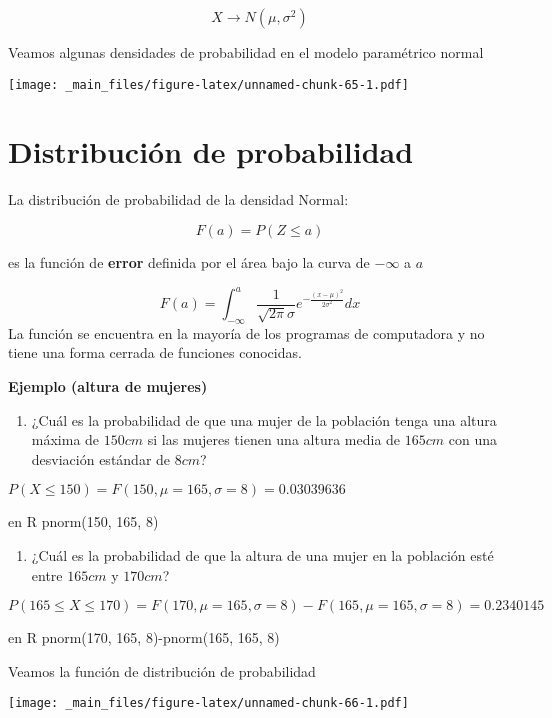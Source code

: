 \documentclass[
]{book}
\providecommand{\tightlist}{%
  \setlength{\itemsep}{0pt}\setlength{\parskip}{0pt}}
\begin{document}
\[X\rightarrow N(\mu,\sigma^2)\]

Veamos algunas densidades de probabilidad en el modelo paramétrico normal

\texttt{[image: \_main\_files/figure-latex/unnamed-chunk-65-1.pdf]}

\hypertarget{distribuciuxf3n-de-probabilidad-2}{%
\section{Distribución de probabilidad}\label{distribuciuxf3n-de-probabilidad-2}}

La distribución de probabilidad de la densidad Normal:

\[F(a)=P(Z \leq a)\]

es la función de \textbf{error} definida por el área bajo la curva de \(-\infty\) a \(a\)

\[F(a)=\int_{-\infty}^{a}\frac{1}{\sqrt{2\pi}\sigma}e^{-\frac{(x-\mu) ^2}{2\sigma^2}} dx\]
La función se encuentra en la mayoría de los programas de computadora y no tiene una forma cerrada de funciones conocidas.

\textbf{Ejemplo (altura de mujeres)}

\begin{enumerate}
\def\labelenumi{\arabic{enumi})}
\tightlist
\item
  ¿Cuál es la probabilidad de que una mujer de la población tenga una altura máxima de \(150 cm\) si las mujeres tienen una altura media de \(165 cm\) con una desviación estándar de \(8 cm\)?
\end{enumerate}

\(P(X\le 150)=F(150, \mu=165, \sigma=8)=0.03039636\)

en R pnorm(150, 165, 8)

\begin{enumerate}
\def\labelenumi{\arabic{enumi})}
\setcounter{enumi}{1}
\tightlist
\item
  ¿Cuál es la probabilidad de que la altura de una mujer en la población esté entre \(165cm\) y \(170cm\)?
\end{enumerate}

\(P(165 \le X \le 170)=F(170, \mu=165, \sigma=8)-F(165, \mu=165, \sigma=8)=0.2340145\)

en R pnorm(170, 165, 8)-pnorm(165, 165, 8)

Veamos la función de distribución de probabilidad

\texttt{[image: \_main\_files/figure-latex/unnamed-chunk-66-1.pdf]}
\end{document}
